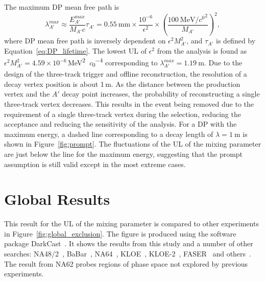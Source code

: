 \documentclass[../../main.tex]{subfiles}
\begin{document}
    The maximum \gls{DP} mean free path is
    \begin{equation}
        \lambda^{max}_{A'} \approx \frac{E^{max}_{A'}}{M_{A'} c} \tau_{A'} = \SI{0.55}{\milli\metre} \times \frac{10^{-6}}{\epsilon^2} \times \left(\frac{\SI{100}{\mega\electronvolt\per\clight\squared}}{M_{A'}}\right)^2,
    \end{equation}
    where \gls{DP} mean free path is inversely dependent on $\epsilon^2 M_{A'}^2$, and $\tau_{A'}$ is defined by Equation~\ref{eq:DP_lifetime}. The lowest \gls{UL} of $\epsilon^2$ from the analysis is found as 
    $\epsilon^2 M_{A'}^2 = 4.59 \times 10^{-6}$\,\si{\mega\electronvolt^2\per\clight^4}  %
    corresponding to $\lambda^{max}_{A'} = \SI{1.19}{\meter}$. %
    Due to the design of the three-track trigger and offline reconstruction, the resolution of a decay vertex position is about 1\,m. As the distance between the production vertex and the $A'$ decay point increases, the probability of reconstructing a single three-track vertex decreases. This results in the event being removed due to the requirement of a single three-track vertex during the selection, reducing the acceptance and reducing the sensitivity of the analysis.
    For a \gls{DP} with the maximum energy, a dashed line corresponding to a decay length of $\lambda = \SI{1}{\meter}$ is shown in Figure~\ref{fig:prompt}. The fluctuations of the \gls{UL} of the mixing parameter are just below the line for the maximum energy, suggesting that the prompt assumption is still valid except in the most extreme cases.

    \section{Global Results}
    This result for the \gls{UL} of the mixing parameter is compared to other experiments in Figure~\ref{fig:global_exclusion}. The figure is produced using the software package DarkCast~\cite{Ilten2018,Baruch2022}. It shows the results from this study and a number of other searches: NA48/2~\cite{2015178}, BaBar~\cite{Lees:2014xha}, 
    NA64~\cite{Banerjee:2019hmi}, KLOE~\cite{Anastasi:2015qla}, KLOE-2~\cite{Babusci:2012cr}, FASER~\cite{Petersen:2023hgm} and others~\cite{Davier:1989wz,Bodas:2021fsy}. The result from NA62 probes regions of phase space not explored by previous experiments.
\end{document}
